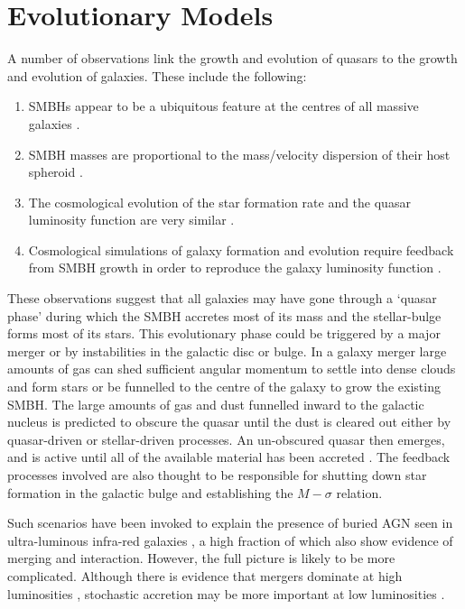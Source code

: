 \section{Evolutionary Models}

A number of observations link the growth and evolution of quasars to the growth and evolution of galaxies. These include the following: 

\begin{enumerate}
\item SMBHs appear to be a ubiquitous feature at the centres of all massive galaxies \citep[e.g.][]{kormendy13}. 
\item SMBH masses are proportional to the mass/velocity dispersion of their host spheroid \citep[the $M-\sigma$ relation;][]{ferrarese00,gebhardt00}.
\item The cosmological evolution of the star formation rate and the quasar luminosity function are very similar \citep[e.g.][]{wall05}.
\item Cosmological simulations of galaxy formation and evolution require feedback from SMBH growth in order to reproduce the galaxy luminosity function \citep{kauffmann00}.
\end{enumerate}

These observations suggest that all galaxies may have gone through a `quasar phase' during which the SMBH accretes most of its mass and the stellar-bulge forms most of its stars. 
This evolutionary phase could be triggered by a major merger or by instabilities in the galactic disc or bulge. 
In a galaxy merger large amounts of gas can shed sufficient angular momentum to settle into dense clouds and form stars or be funnelled to the centre of the galaxy to grow the existing SMBH. 
The large amounts of gas and dust funnelled inward to the galactic nucleus is predicted to obscure the quasar until the dust is cleared out either by quasar-driven or stellar-driven processes. 
An un-obscured quasar then emerges, and is active until all of the available material has been accreted \citep{hopkins06a, narayanan10}. 
The feedback processes involved are also thought to be responsible for shutting down star formation in the galactic bulge \citep{silk98} and establishing the $M-\sigma$ relation. 

Such scenarios have been invoked to explain the presence of buried AGN seen in ultra-luminous infra-red galaxies \citep[ULIRGs;][]{sanders88}, a high fraction of which also show evidence of merging and interaction. 
However, the full picture is likely to be more complicated. Although there is evidence that mergers dominate at high luminosities \citep{treister12}, stochastic accretion may be more important at low luminosities \citep[e.g.][]{hopkins06b}. 

